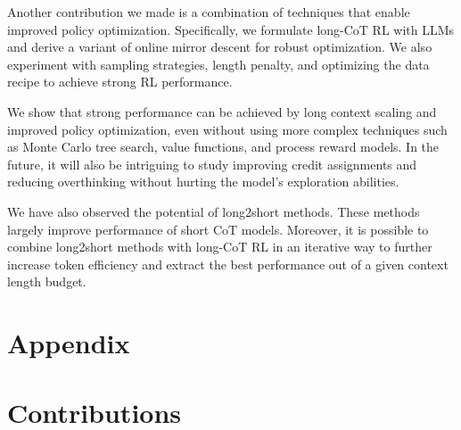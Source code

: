 \documentclass{article}
\begin{document}
Another contribution we made is a combination of techniques that enable improved policy optimization. Specifically, we formulate long-CoT RL with LLMs and derive a variant of online mirror descent for robust optimization. We also experiment with sampling strategies, length penalty, and optimizing the data recipe to achieve strong RL performance.

We show that strong performance can be achieved by long context scaling and improved policy optimization, even without using more complex techniques such as Monte Carlo tree search, value functions, and process reward models. In the future, it will also be intriguing to study improving credit assignments and reducing overthinking without hurting the model's exploration abilities.

We have also observed the potential of long2short methods. These methods largely improve performance of short CoT models. Moreover, it is possible to combine long2short methods with long-CoT RL in an iterative way to further increase token efficiency and extract the best performance out of a given context length budget. 

% 
\printbibliography[title={References}]

\newpage
\appendix

\section*{Appendix}

\section{Contributions}
\end{document}
